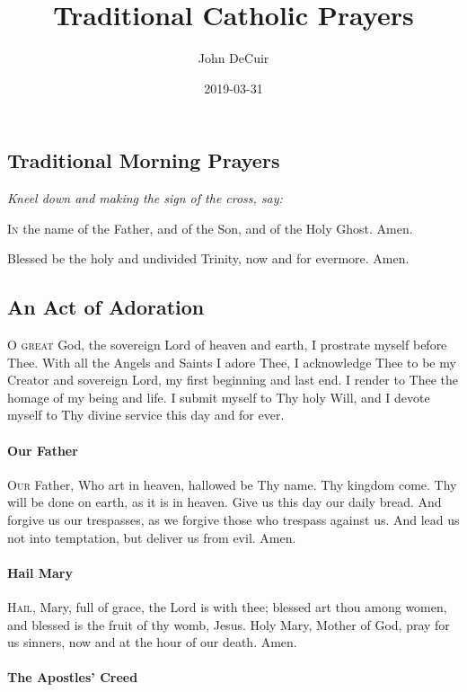 \documentclass[9pt]{article}
\title{Traditional Catholic Prayers}
\date{2019-03-31}
\author{John DeCuir}
\begin{document}
\begin{multicols}{3}

\section*{Traditional Morning Prayers}

\textit{Kneel down and making the sign of the cross, say:}

\textsc{In} the name of the Father, and of the Son, and of the Holy Ghost.
Amen.

Blessed be the holy and undivided Trinity, now and for evermore.
Amen.

\subsection*{An Act of Adoration}

\textsc{O great} God, the sovereign Lord of heaven and earth, I prostrate
myself before Thee.  With all the Angels and Saints I adore
Thee, I acknowledge Thee to be my Creator and sovereign Lord,
my first beginning and last end.  I render to Thee the homage
of my being and life.  I submit myself to Thy holy Will,
and I devote myself to Thy divine service this day and for
ever.

\paragraph{Our Father}

\textsc{Our} Father, Who art in heaven, hallowed be Thy name.
Thy kingdom come.  Thy will be done on earth, as it is in heaven.
Give us this day our daily bread.  And forgive us our trespasses,
as we forgive those who trespass against us.  And lead us not
into temptation, but deliver us from evil.  Amen.

\paragraph{Hail Mary}

\textsc{Hail}, Mary, full of grace, the Lord is with thee;
blessed art thou among women, and blessed is the fruit of
thy womb, Jesus.  Holy Mary, Mother of God, pray for us sinners,
now and at the hour of our death. Amen.

\paragraph{The Apostles' Creed}


\end{multicols}
\end{document}
